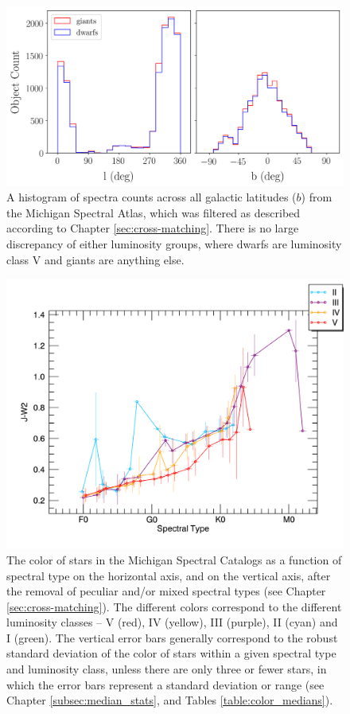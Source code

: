 \begin{figure}
    \centering
    \includegraphics[width=1.0\textwidth]{Figures/populations/hist-b-vs-count.png}
    \caption{A histogram of spectra counts across all galactic latitudes ($b$) from the Michigan Spectral Atlas, which was filtered as described according to Chapter \ref{sec:cross-matching}. There is no large discrepancy of either luminosity groups, where dwarfs are luminosity class V and giants are anything else.}
    \label{fig:b-vs-count}
\end{figure}

\begin{figure}[t]
\centering
\label{fig:median_stick_bar_jw2}
\includegraphics[width=1.0\textwidth,clip=true]{Figures/subtype_bar/SPT_J-W2.png}
\caption{The color of stars in the Michigan Spectral Catalogs as a function of spectral type on the horizontal axis, and \jwtwo on the vertical axis, after the removal of peculiar and/or mixed spectral types (see Chapter \ref{sec:cross-matching}). The different colors correspond to the different luminosity classes -- V (red), IV (yellow), III (purple), II (cyan) and I (green).  The vertical error bars generally correspond to the robust standard deviation of the \jwtwo color of stars within a given spectral type and luminosity class, unless there are only three or fewer stars, in which the error bars represent a standard deviation or range (see Chapter \ref{subsec:median_stats}, and Tables \ref{table:color_medians}).}
\label{fig:median_jw2}
\end{figure}
